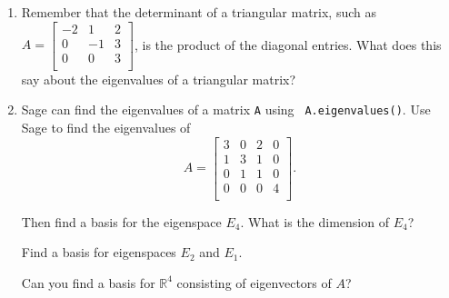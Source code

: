 \documentclass[12pt]{article}
\newcommand{\vs}[1]{\vspace{#1in}}
\newcommand{\real}{{\mathbb R}}
\begin{document}
\begin{enumerate}
\item Remember that the determinant of a triangular matrix, such as
  $
  A =
  \left[
    \begin{array}{ccc}
      -2 & 1 & 2 \\
      0 & -1 & 3 \\
      0 & 0 & 3 \\
    \end{array}
  \right]
  $,
  is the product of the diagonal entries.  What does this say about
  the eigenvalues of a triangular matrix?

  \vs{1.5}
\item Sage can find the eigenvalues of a matrix {\tt A} using {\tt
    A.eigenvalues()}.  Use Sage to find the eigenvalues of
  $$
  A =
  \left[
    \begin{array}{cccc}
      3 & 0 & 2 & 0 \\
      1 & 3 & 1 & 0 \\
      0 & 1 & 1 & 0 \\
      0 & 0 & 0 & 4 \\
    \end{array}
  \right].
  $$

  \vs{0.5}
  Then find a basis for the eigenspace $E_4$.  What is the dimension of
  $E_4$?

  \vs{2.5}
  Find a basis for eigenspaces $E_2$ and $E_1$.

  \vs{2.5}
  Can you find a basis for $\real^4$ consisting of eigenvectors of
  $A$? 

  
  
  
  
  
  

\end{enumerate}
\end{document}
